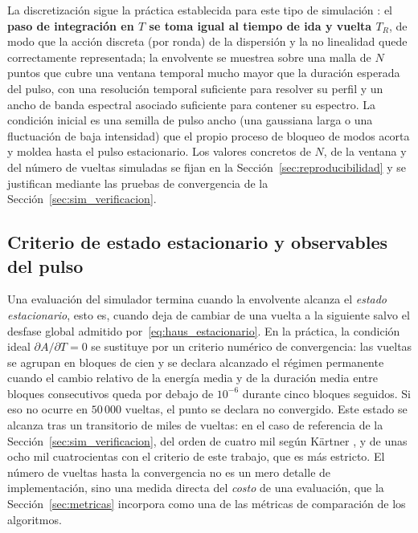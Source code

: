 La discretización sigue la práctica establecida para este tipo de simulación
\cite{Kaertner2020}: el \textbf{paso de integración en $T$ se toma igual al tiempo
de ida y vuelta $T_R$}, de modo que la acción discreta (por ronda) de la dispersión
y la no linealidad quede correctamente representada; la envolvente se muestrea sobre
una malla de $N$ puntos que cubre una ventana temporal mucho mayor que la duración
esperada del pulso, con una resolución temporal suficiente para resolver su perfil y
un ancho de banda espectral asociado suficiente para contener su espectro. La
condición inicial es una semilla de pulso ancho (una gaussiana larga o una
fluctuación de baja intensidad) que el propio proceso de bloqueo de modos acorta y
moldea hasta el pulso estacionario. Los valores concretos de $N$, de la ventana y
del número de vueltas simuladas se fijan en la Sección~\ref{sec:reproducibilidad} y
se justifican mediante las pruebas de convergencia de la
Sección~\ref{sec:sim_verificacion}.

\subsection{Criterio de estado estacionario y observables del pulso}
\label{sec:sim_estacionario}

Una evaluación del simulador termina cuando la envolvente alcanza el
\emph{estado estacionario}, esto es, cuando deja de cambiar de una vuelta a la
siguiente salvo el desfase global admitido por~\eqref{eq:haus_estacionario}. En la
práctica, la condición ideal $\partial A/\partial T=0$ se sustituye por un criterio
numérico de convergencia: las vueltas se agrupan en bloques de cien y se declara
alcanzado el régimen permanente cuando el cambio relativo de la energía media y de la
duración media entre bloques consecutivos queda por debajo de $10^{-6}$ durante cinco
bloques seguidos. Si eso no ocurre en $50\,000$ vueltas, el punto se declara no
convergido. Este estado se alcanza tras un
transitorio de miles de vueltas: en el caso de referencia de la
Sección~\ref{sec:sim_verificacion}, del orden de cuatro mil según Kärtner
\cite{Kaertner2020}, y de unas ocho mil cuatrocientas con el criterio de este trabajo,
que es más estricto. El número de vueltas hasta la convergencia no es un mero detalle
de implementación, sino una medida directa del \emph{costo} de una evaluación, que
la Sección~\ref{sec:metricas} incorpora como una de las métricas de comparación de
los algoritmos.

